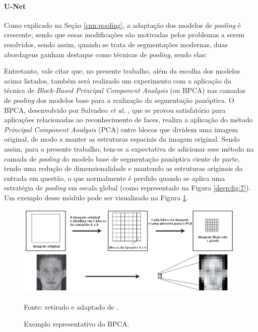 \paragraph{U-Net}

Como explicado na Seção \ref{cnn:pooling}, a adaptação dos modelos de \textit{pooling} é crescente, sendo que essas modificações são motivadas pelos problemas a serem resolvidos, sendo assim, quando se trata de segmentações modernas, duas abordagens ganham destaque como técnicas de \textit{pooling}, sendo elas:

Entretanto, vale citar que, no presente trabalho, além da escolha dos modelos acima listados, também será realizado um experimento com a aplicação da técnica de \textit{Block-Based Principal Component Analysis} (ou BPCA) nas camadas de \textit{pooling} dos modelos base para a realização da segmentação panóptica. O BPCA, desenvolvido por Salvadeo \textit{et al.} \cite{Salvadeo2011}, que se provou satisfatório para aplicações relacionadas ao reconhecimento de faces, realiza a aplicação do método \textit{Principal Component Analysis} (PCA) entre blocos que dividem uma imagem original, de modo a manter as estruturas espaciais da imagem original. Sendo assim, para o presente trabalho, tem-se a expectativa de adicionar esse método na camada de \textit{pooling} do modelo base  de segmentação panóptica ciente de parte, tendo uma redução de dimensionalidade e mantendo as estruturas originais da entrada em questão, o que normalmente é perdido quando se aplica uma estratégia de \textit{pooling} em escala global (como representado na Figura \ref{deep:fig:7}).  Um exemplo desse módulo pode ser visualizado na Figura \ref{proposal:pcapooling:fig:3}.

\begin{figure}[H]
    \centering
    \caption{Exemplo representativo do BPCA.}
    \includegraphics[width=1\textwidth]{recursos/imagens/proposal/BPCA.png}
    \label{proposal:pcapooling:fig:3}

    Fonte: retirado e adaptado de \cite{Salvadeo2011}.
\end{figure}

